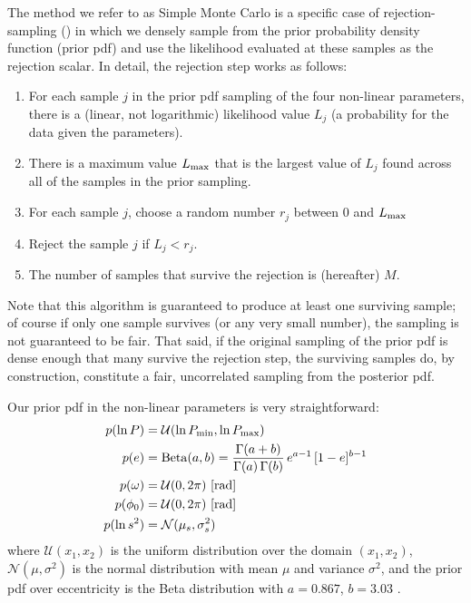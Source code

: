 \documentclass[manuscript, letterpaper]{aastex6}
\begin{document}
The method we refer to as Simple Monte Carlo is a specific case of
rejection-sampling (\citealt{VonNeumann:1951}) in which we densely sample from
the prior probability density function (prior pdf) and use the likelihood
evaluated at these samples as the rejection scalar.
In detail, the rejection step works as follows:
\begin{enumerate}\itemsep0ex
\item For each sample $j$ in the prior pdf sampling of the four non-linear
  parameters, there is a (linear, not logarithmic) likelihood value $L_j$ (a
  probability for the data given the parameters).
\item There is a maximum value $L_{\rm max}$ that is the largest value of
  $L_j$ found across all of the samples in the prior sampling.
\item For each sample $j$, choose a random number $r_j$ between 0 and
  $L_{\rm max}$
\item Reject the sample $j$ if $L_j < r_j$.
\item The number of samples that survive the rejection is (hereafter) $M$.
\end{enumerate}
Note that this algorithm is guaranteed to produce at least one
surviving sample; of course if only one sample survives (or any very
small number), the sampling is not guaranteed to be fair.
That said, if the original sampling of the prior pdf is dense enough
that many survive the rejection step, the surviving samples do, by construction,
constitute a fair, uncorrelated sampling from the posterior pdf.

Our prior pdf in the non-linear parameters is very straightforward:
\begin{align}
    p(\ln P) &= \mathcal{U}(\ln P_{\rm min}, \ln P_{\rm max})\\
    p(e) &= {\rm Beta}(a, b) = \frac{\Gamma(a+b)}{\Gamma(a) \, \Gamma(b)} \, e^{a-1} \, [1 - e]^{b-1}\\
    p(\omega) &= \mathcal{U}(0, 2\pi) ~ [{\rm rad}]\\
    p(\phi_0) &= \mathcal{U}(0, 2\pi) ~ [{\rm rad}]\\
    p(\ln s^2) &= \mathcal{N}(\mu_s, \sigma^2_s)
\end{align}
where $\mathcal{U}(x_1, x_2)$ is the uniform distribution over the domain $(x_1,
x_2)$, $\mathcal{N}(\mu, \sigma^2)$ is the normal distribution with mean $\mu$
and variance $\sigma^2$, and the prior pdf over eccentricity is the Beta
distribution with $a=0.867$, $b=3.03$ \citep{Kipping:2013}.
\end{document}
